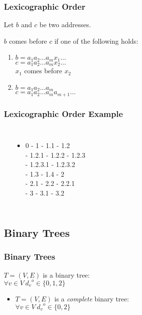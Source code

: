 \documentclass[dvipsnames]{beamer}
\begin{document}
\begin{frame}
  \frametitle{Lexicographic Order}

  \begin{definition}
    Let $b$ and $c$ be two addresses.

    $b$ comes before $c$ if one of the following holds:
    \begin{enumerate}
      \item $b=a_1 a_2 \ldots a_m x_1 \ldots$\\
        $c=a_1 a_2 \ldots a_m x_2 \ldots$\\
        $x_1$ comes before $x_2$
      \pause
      \item $b=a_1 a_2 \ldots a_m$\\
        $c=a_1 a_2 \ldots a_m a_{m+1} \ldots$
    \end{enumerate}
  \end{definition}
\end{frame}

\begin{frame}
  \frametitle{Lexicographic Order Example}

  \begin{example}
    \begin{columns}
      \begin{center}
      \end{center}

      \begin{itemize}
        \item 0 - 1 - 1.1 - 1.2\\
          - 1.2.1 - 1.2.2 - 1.2.3\\
          - 1.2.3.1 - 1.2.3.2\\
          - 1.3 - 1.4 - 2\\
          - 2.1 - 2.2 - 2.2.1\\
          - 3 - 3.1 - 3.2
      \end{itemize}
    \end{columns}
  \end{example}
\end{frame}

\subsection{Binary Trees}

\begin{frame}
  \frametitle{Binary Trees}

  \begin{definition}
    $T=(V,E)$ is a \alert{binary tree}:\\
    $\forall v \in V~{d_v}^o \in \{0,1,2\}$
  \end{definition}

  \begin{itemize}
    \item $T=(V,E)$ is a \emph{complete} binary tree:\\
      $\forall v \in V~{d_v}^o \in \{0,2\}$
  \end{itemize}

\end{frame}
\end{document}
